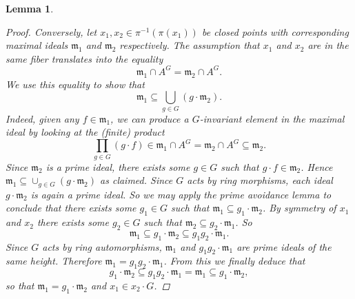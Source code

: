 \documentclass[12pt,a4paper]{amsart}
\theoremstyle{plain}
\newtheorem{lm}[thm]{Lemma}
\theoremstyle{definition}
\theoremstyle{remark}
\begin{document}
\begin{lm}
\begin{proof}
    Conversely, let $x_{1}, x_{2} \in \pi^{-1}(\pi(x_{1}))$ be closed points with corresponding maximal ideals $\mathfrak{m}_{1}$ and $\mathfrak{m}_{2}$ respectively.
    The assumption that $x_{1}$ and $x_{2}$ are in the same fiber translates into the equality
    \[ \mathfrak{m}_{1} \cap A^{G} = \mathfrak{m}_{2} \cap A^{G}. \]
    We use this equality to show that
    \[ \mathfrak{m}_{1} \subseteq \bigcup_{g \in G} (g \cdot \mathfrak{m}_{2}). \]
    Indeed, given any $f \in \mathfrak{m}_{1}$, we can produce a $G$-invariant element in the maximal ideal by looking at the (finite) product
    \[ \prod_{g \in G} (g \cdot f) \in \mathfrak{m}_{1} \cap A^{G} = \mathfrak{m}_{2} \cap A^{G} \subseteq \mathfrak{m}_{2}. \]
    Since $\mathfrak{m}_{2}$ is a prime ideal, there exists some $g \in G$ such that $g \cdot f \in \mathfrak{m}_{2}$.
    Hence $\mathfrak{m}_{1} \subseteq \cup_{g \in G} (g \cdot \mathfrak{m}_{2})$ as claimed.
    Since $G$ acts by ring morphisms, each ideal $g \cdot \mathfrak{m}_{2}$ is again a prime ideal.
    So we may apply the prime avoidance lemma to conclude that there exists some $g_{1} \in G$ such that $\mathfrak{m}_{1} \subseteq g_{1} \cdot \mathfrak{m}_{2}$.
    By symmetry of $x_{1}$ and $x_{2}$ there exists some $g_{2} \in G$ such that $\mathfrak{m}_{2} \subseteq g_{2} \cdot \mathfrak{m}_{1}$.
    So
    \[ \mathfrak{m}_{1} \subseteq g_{1} \cdot \mathfrak{m}_{2} \subseteq g_{1} g_{2} \cdot \mathfrak{m}_{1}. \]
    Since $G$ acts by ring automorphisms, $\mathfrak{m}_{1}$ and $g_{1} g_{2} \cdot \mathfrak{m}_{1}$ are prime ideals of the same height.
    Therefore $\mathfrak{m}_{1} = g_{1} g_{2} \cdot \mathfrak{m}_{1}$.
    From this we finally deduce that
    \[ g_{1} \cdot \mathfrak{m}_{2} \subseteq g_{1}g_{2} \cdot \mathfrak{m}_{1} = \mathfrak{m}_{1} \subseteq g_{1} \cdot \mathfrak{m}_{2}, \]
    so that $\mathfrak{m}_{1} = g_{1} \cdot \mathfrak{m}_{2}$ and $x_{1} \in x_{2} \cdot G$.
  \end{proof}
\end{lm}



\vfill
\end{document}
